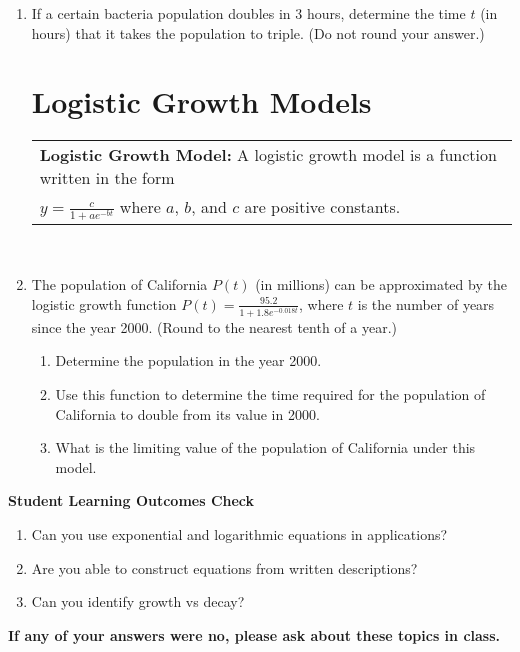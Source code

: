 \documentclass[11pt]{article}
\begin{document}
\begin{enumerate}
\item If a certain bacteria population doubles in 3 hours, determine the time $t$ (in hours) that it takes the population to triple. (Do not round your answer.)\\[2in]

\newpage

\section{Logistic Growth Models}

\noindent \begin{tabular}{| l |} \hline
\textbf{Logistic Growth Model:  } A logistic growth model is a function written in the form \\
$\displaystyle y=\frac{c}{1+ae^{-bt}}$ where $a$, $b$, and $c$ are positive constants.
\\ \hline
\end{tabular} \\

\item The population of California $P(t)$ (in millions) can be approximated by the logistic growth function $\displaystyle P(t)=\frac{95.2}{1+1.8e^{-0.018t}}$, where $t$ is the number of years since the year 2000. (Round to the nearest tenth of a year.)

\begin{enumerate}
\item Determine the population in the year 2000.\\[.5in]
\item Use this function to determine the time required for the population of California to double from its value in 2000.\vfill
\item What is the limiting value of the population of California under this model.\\[1in]
\end{enumerate}

\end{enumerate}

\noindent \textbf{Student Learning Outcomes Check}

\begin{enumerate}
\item Can you use exponential and logarithmic equations in applications?
\item Are you able to construct equations from written descriptions?
\item Can you identify growth vs decay?
\end{enumerate}

\noindent \textbf{If any of your answers were no, please ask about these topics in class.}
\end{document}
